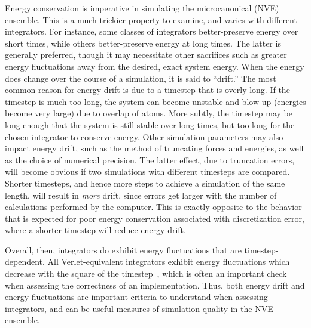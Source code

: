 \documentclass[9pt,bestpractices]{livecoms}
\begin{document}
Energy conservation is imperative in simulating the microcanonical (NVE) ensemble.
This is a much trickier property to examine, and varies with different integrators.
For instance, some classes of integrators better-preserve energy over short times, while others better-preserve energy at long times.
The latter is generally preferred, though it may necessitate other sacrifices such as greater energy fluctuations away from the desired, exact system energy.
When the energy does change over the course of a simulation, it is said to ``drift.''
The most common reason for energy drift is due to a timestep that is overly long.
If the timestep is much too long, the system can become unstable and blow up (energies become very large) due to overlap of atoms.
More subtly, the timestep may be long enough that the system is still stable over long times, but too long for the chosen integrator to conserve energy.
Other simulation parameters may also impact energy drift, such as the method of truncating forces and energies, as well as the choice of numerical precision.
The latter effect, due to truncation errors, will become obvious if two simulations with different timesteps are compared.
Shorter timesteps, and hence more steps to achieve a simulation of the same length, will result in \textit{more} drift, since errors get larger with the number of calculations performed by the computer.
This is exactly opposite to the behavior that is expected for poor energy conservation associated with discretization error, where a shorter timestep will reduce energy drift.

Overall, then, integrators do exhibit energy fluctuations that are timestep-dependent.
All Verlet-equivalent integrators exhibit energy fluctuations which decrease with the square of the timestep~\cite{allen_computer_2017}, which is often an important check when assessing the correctness of an implementation.
Thus, both energy drift and energy fluctuations are important criteria to understand when assessing integrators, and can be useful measures of simulation quality in the NVE ensemble.
\end{document}
